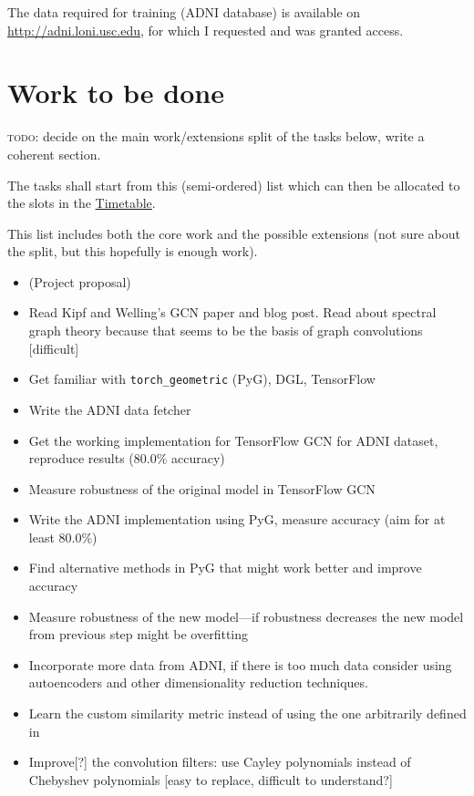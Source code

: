\documentclass[12pt,a4paper,twoside]{article}
\begin{document}
The data required for training (ADNI database) is available on \url{http://adni.loni.usc.edu}, for which I requested and was granted access.

\section*{Work to be done}
\label{section:work}

\textsc{todo}: decide on the main work/extensions split of the tasks below, write a coherent section.

The tasks shall start from this (semi-ordered) list which can then be allocated to the slots in the \hyperref[section:timetable]{Timetable}. 

This list includes both the core work and the possible extensions (not sure about the split, but this hopefully is enough work).

\begin{itemize}
  \item (Project proposal)
  \item Read Kipf and Welling's GCN paper \cite{kipf2017semi} and blog post. Read about spectral graph theory because that seems to be the basis of graph convolutions [difficult]
  \item Get familiar with \texttt{torch\_geometric} (PyG), DGL, TensorFlow
  \item Write the ADNI data fetcher
  \item Get the working implementation for TensorFlow GCN for ADNI dataset, reproduce results (80.0\% accuracy)
  \item Measure robustness of the original model in TensorFlow GCN
  \item Write the ADNI implementation using PyG, measure accuracy (aim for at least 80.0\%)
  \item Find alternative methods in PyG that might work better and improve accuracy
  \item Measure robustness of the new model—if robustness decreases the new model from previous step might be overfitting
  \item Incorporate more data from ADNI, if there is too much data consider using autoencoders and other dimensionality reduction techniques.
  \item Learn the custom similarity metric instead of using the one arbitrarily defined in \cite{parisot2017spectral,parisot2018disease}
  \item Improve[?] the convolution filters: use Cayley polynomials instead of Chebyshev polynomials [easy to replace, difficult to understand?]
\end{itemize}
\end{document}
